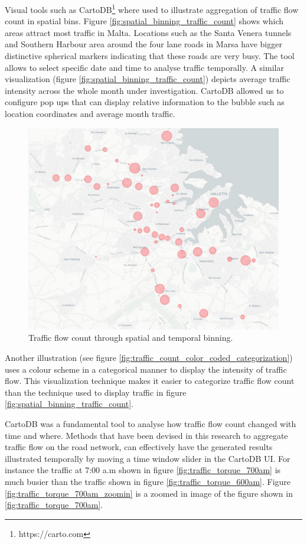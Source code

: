 \documentclass[12pt, a4paper]{report}
\theoremstyle{definition}
\theoremstyle{definition}%
\theoremstyle{definition}%
\theoremstyle{definition}%
\theoremstyle{definition}%
\theoremstyle{definition}%
\begin{document}
Visual tools such as CartoDB\footnote{https://carto.com} where used to illustrate aggregation of traffic flow count in spatial bins. Figure \ref{fig:spatial_binning_traffic_count} shows which areas attract most traffic in Malta. Locations such as the Santa Venera tunnels and Southern Harbour area around the four lane roads in Marsa have bigger distinctive spherical markers indicating that these roads are very busy. The tool allows to select specific date and time to analyse traffic temporally. A similar visualization (figure \ref{fig:spatial_binning_traffic_count}) depicts average traffic intensity across the whole month under investigation. CartoDB allowed us to configure pop ups that can display relative information to the bubble such as location coordinates and average month traffic.

\begin{figure}[!]	
	\includegraphics[scale=0.5]{traffic_month_average.jpg}
	\centering
	\caption{Traffic flow count through spatial and temporal binning. }
	\label{fig:traffic_month_average}
\end{figure}

Another illustration (see figure \ref{fig:traffic_count_color_coded_categorization}) uses a colour scheme in a categorical manner to display the intensity of traffic flow. This visualization technique makes it easier to categorize traffic flow count than the technique used to display traffic in figure \ref{fig:spatial_binning_traffic_count}.

CartoDB was a fundamental tool to analyse how traffic flow count changed with time and where. Methods that have been devised in this research to aggregate traffic flow on the road network, can effectively have the generated results illustrated temporally by moving a time window slider in the CartoDB UI. For instance the traffic at 7:00 a.m shown in figure \ref{fig:traffic_torque_700am} is much busier than the traffic shown in figure  \ref{fig:traffic_torque_600am}. Figure \ref{fig:traffic_torque_700am_zoomin} is a zoomed in image of the figure shown in  \ref{fig:traffic_torque_700am}.
\end{document}
